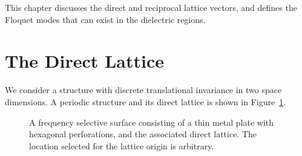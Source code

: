 This chapter discusses the direct and reciprocal lattice vectors, and
defines the Floquet modes that can exist in the dielectric regions.

\section{The Direct Lattice}
We consider a structure with discrete translational invariance in two space
dimensions.   A periodic structure and its direct lattice is shown in
Figure~\ref{fig:direct}.
\begin{figure}[htbp]
  \begin{center}
    \caption{A frequency selective surface consisting of a thin metal plate
        with hexagonal perforations, and the associated direct
        lattice. The location selected for the lattice origin is arbitrary.}
    \label{fig:direct}
  \end{center}
\end{figure}

